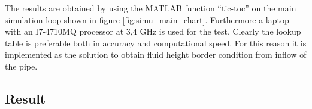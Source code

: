 The results are obtained by using the MATLAB function ``tic-toc'' on the main simulation loop shown in figure \ref{fig:simu_main_chart}. Furthermore a laptop with an I7-4710MQ processor at 3,4 GHz is used for the test. Clearly the lookup table is preferable both in accuracy and computational speed. For this reason it is implemented as the solution to obtain fluid height border condition from inflow of the pipe.

\subsection*{Result}


